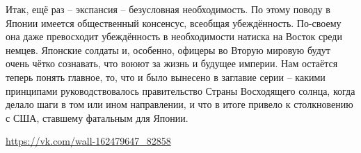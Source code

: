 Итак, ещё раз – экспансия – безусловная необходимость. По этому поводу в Японии имеется общественный консенсус, всеобщая убеждённость. По-своему она даже превосходит убеждённость в необходимости натиска на Восток среди немцев. Японские солдаты и, особенно, офицеры во Вторую мировую будут очень чётко сознавать, что воюют за жизнь и будущее империи. Нам остаётся теперь понять главное, то, что и было вынесено в заглавие серии – какими принципами руководствовалось правительство Страны Восходящего солнца, когда делало шаги в том или ином направлении, и что в итоге привело к столкновению с США, ставшему фатальным для Японии. 

\url{https://vk.com/wall-162479647_82858}